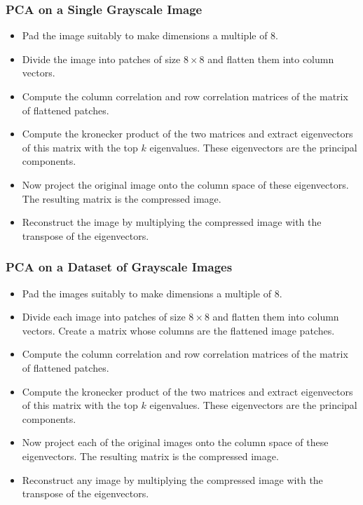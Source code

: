 \documentclass[Serif, 10pt, brown]{beamer}
\theoremstyle{example}
\theoremstyle{plain}
\begin{document}
\begin{frame}
	\frametitle{PCA on a Single Grayscale Image}
	\begin{itemize}
		\item Pad the image suitably to make dimensions a multiple of $8$.
		\item Divide the image into patches of size $8 \times 8$ and flatten them into column vectors.
		\item Compute the column correlation and row correlation matrices of the matrix of flattened patches.
		\item Compute the kronecker product of the two matrices and extract eigenvectors of this matrix with the top $k$ eigenvalues. These eigenvectors are the principal components.
		\item Now project the original image onto the column space of these eigenvectors. The resulting matrix is the compressed image.
		\item Reconstruct the image by multiplying the compressed image with the transpose of the eigenvectors. 
	\end{itemize}
\end{frame}

\begin{frame}
	\frametitle{PCA on a Dataset of Grayscale Images}
	\begin{itemize}
		\item Pad the images suitably to make dimensions a multiple of $8$.
		\item Divide each image into patches of size $8 \times 8$ and flatten them into column vectors. Create a matrix whose columns are the flattened image patches.
		\item Compute the column correlation and row correlation matrices of the matrix of flattened patches.
		\item Compute the kronecker product of the two matrices and extract eigenvectors of this matrix with the top $k$ eigenvalues. These eigenvectors are the principal components.
		\item Now project each of the original images onto the column space of these eigenvectors. The resulting matrix is the compressed image.
		\item Reconstruct any image by multiplying the compressed image with the transpose of the eigenvectors. 
	\end{itemize}
\end{frame}
\end{document}
